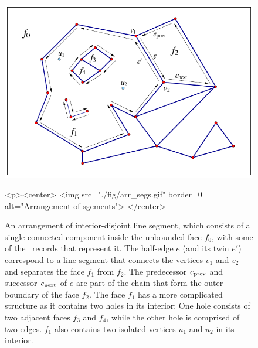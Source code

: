 \begin{figure}[!htp]
\begin{ccTexOnly}
  \begin{center}
  \includegraphics{Arrangement_2/fig/arr_segs}
  \end{center}
\end{ccTexOnly}
\begin{ccHtmlOnly}
  <p><center>
  <img src="./fig/arr_segs.gif" border=0 alt="Arrangement of sgements">
  </center>
\end{ccHtmlOnly}
\caption{An arrangement of interior-disjoint line segment, which
consists of a single connected component inside the unbounded face
$f_0$, with some of the \dcel\ records that represent it.
The half-edge $e$ (and its twin $e'$) correspond to a line segment
that connects the vertices $v_1$ and $v_2$ and separates the face
$f_1$ from $f_2$. The predecessor $e_{\rm prev}$ and successor
$e_{\rm next}$ of $e$ are part of the chain that form the outer
boundary of the face $f_2$. The face $f_1$ has a more complicated
structure as it contains two holes in its interior: One hole
consists of two adjacent faces $f_3$ and $f_4$, while the other
hole is comprised of two edges. $f_1$ also contains two isolated
vertices $u_1$ and $u_2$ in its interior.}
\label{arr_fig:seg_dcel}
\end{figure}

